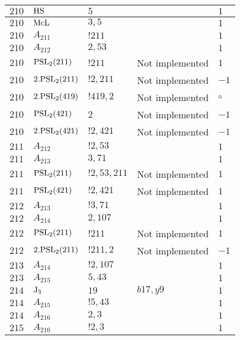\documentclass[a4paper, 11pt]{article}
\begin{document}
\begin{longtable}{lllll}
        $ 210 $ & $ {\rm HS} $ & $ 5 $ & $ ~ $ & $ 1$ \\ \hline
        $ 210 $ & $ {\rm McL} $ & $ 3,5 $ & $ ~ $ & $ 1$ \\ \hline
        $ 210 $ & $ A_{211} $ & $ !211 $ & $ ~ $ & $ 1$ \\ \hline
        $ 210 $ & $ A_{212} $ & $ 2, 53 $ & $ ~ $ & $ 1$ \\ \hline
        $ 210 $ & $ {\rm PSL}_{2}(211) $ & $ !211 $ &  Not implemented & $ 1$ \\ \hline
        $ 210 $ & $ 2.{\rm PSL}_{2}(211) $ & $ !2, 211 $ &  Not implemented & $ -1$ \\ \hline
        $ 210 $ & $ 2.{\rm PSL}_{2}(419) $ & $ !419, 2 $ &  Not implemented &  $\circ$ \\ \hline
        $ 210 $ & $ {\rm PSL}_{2}(421) $ & $ 2 $ &  Not implemented & $ -1$ \\ \hline
        $ 210 $ & $ 2.{\rm PSL}_{2}(421) $ & $ !2, 421 $ &  Not implemented & $ -1$ \\ \hline
        $ 211 $ & $ A_{212} $ & $ !2, 53 $ & $ ~ $ & $ 1$ \\ \hline
        $ 211 $ & $ A_{213} $ & $ 3, 71 $ & $ ~ $ & $ 1$ \\ \hline
        $ 211 $ & $ {\rm PSL}_{2}(211) $ & $ !2, 53, 211 $ &  Not implemented & $ 1$ \\ \hline
        $ 211 $ & $ {\rm PSL}_{2}(421) $ & $ !2, 421 $ &  Not implemented & $ 1$ \\ \hline
        $ 212 $ & $ A_{213} $ & $ !3, 71 $ & $ ~ $ & $ 1$ \\ \hline
        $ 212 $ & $ A_{214} $ & $ 2, 107 $ & $ ~ $ & $ 1$ \\ \hline
        $ 212 $ & $ {\rm PSL}_{2}(211) $ & $ !211 $ &  Not implemented & $ 1$ \\ \hline
        $ 212 $ & $ 2.{\rm PSL}_{2}(211) $ & $ !211, 2 $ &  Not implemented & $ -1$ \\ \hline
        $ 213 $ & $ A_{214} $ & $ !2, 107 $ & $ ~ $ & $ 1$ \\ \hline
        $ 213 $ & $ A_{215} $ & $ 5, 43 $ & $ ~ $ & $ 1$ \\ \hline
        $ 214 $ & $ {\rm J}_3 $ & $ 19 $ & $ b17, y9 $ & $ 1$ \\ \hline
        $ 214 $ & $ A_{215} $ & $ !5, 43 $ & $ ~ $ & $ 1$ \\ \hline
        $ 214 $ & $ A_{216} $ & $ 2, 3 $ & $ ~ $ & $ 1$ \\ \hline
        $ 215 $ & $ A_{216} $ & $ !2, 3 $ & $ ~ $ & $ 1$ \\ \hline

\end{longtable}
\end{document}
